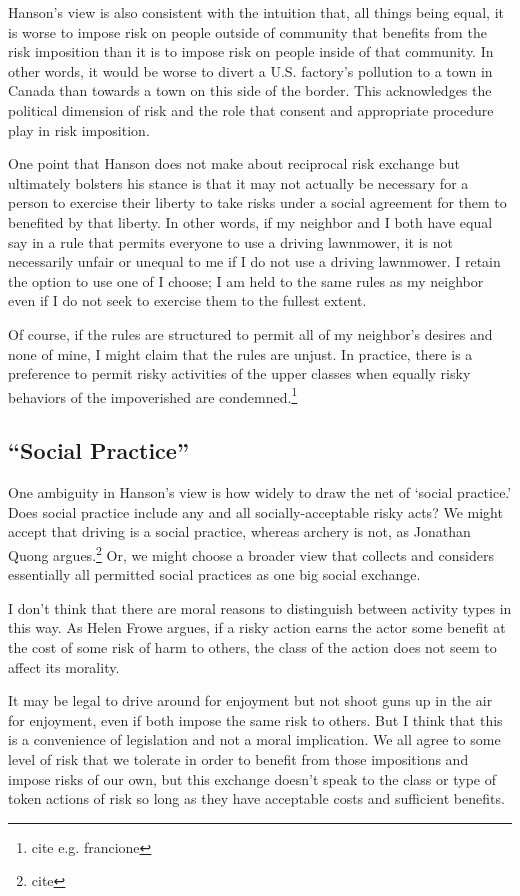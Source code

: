 \documentclass[12pt]{article}
\begin{document}
Hanson’s view is also consistent with the intuition that, all things being
equal, it is worse to impose risk on people outside of community that benefits
from the risk imposition than it is to impose risk on people inside of that
community. In other words, it would be worse to divert a U.S. factory’s
pollution to a town in Canada than towards a town on this side of the border.
This acknowledges the political dimension of risk and the role that consent and
appropriate procedure play in risk imposition.

One point that Hanson does not make about reciprocal risk exchange but
ultimately bolsters his stance is that it may not actually be necessary for a
person to exercise their liberty to take risks under a social agreement for
them to benefited by that liberty. In other words, if my neighbor and I both
have equal say in a rule that permits everyone to use a driving lawnmower, it
is not necessarily unfair or unequal to me if I do not use a driving lawnmower.
I retain the option to use one of I choose; I am held to the same rules as my
neighbor even if I do not seek to exercise them to the fullest extent.

Of course, if the rules are structured to permit all of my neighbor’s desires
and none of mine, I might claim that the rules are unjust. In practice, there
is a preference to permit risky activities of the upper classes when equally
risky behaviors of the impoverished are condemned.\footnote{cite e.g. francione}

\subsection{“Social Practice”}

One ambiguity in Hanson’s view is how widely to draw the net of ‘social
practice.’ Does social practice include any and all socially-acceptable risky
acts? We might accept that driving is a social practice, whereas archery is
not, as Jonathan Quong argues.\footnote{cite} Or, we might choose a broader
view that collects and considers essentially all permitted social practices as
one big social exchange.

I don’t think that there are moral reasons to distinguish between activity
types in this way. As Helen Frowe argues, if a risky action earns the actor
some benefit at the cost of some risk of harm to others, the class of the
action does not seem to affect its morality. 

It may be legal to drive around for enjoyment but not shoot guns up in the air
for enjoyment, even if both impose the same risk to others. But I think that
this is a convenience of legislation and not a moral implication. We all agree
to some level of risk that we tolerate in order to benefit from those
impositions and impose risks of our own, but this exchange doesn’t speak to the
class or type of token actions of risk so long as they have acceptable costs
and sufficient benefits.
\end{document}
